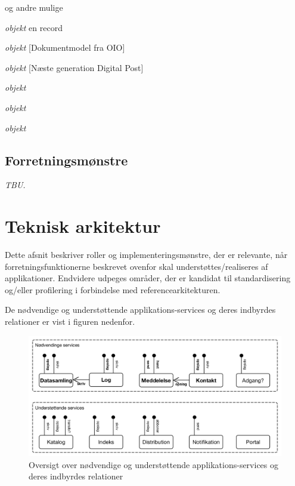 og andre mulige

\begin{description}
\tightlist
\item[registeroplysning]
\emph{objekt} en record
\item[dokument]
\emph{objekt} {[}Dokumentmodel fra OIO{]}
\item[påmindelse]
\emph{objekt} {[}Næste generation Digital Post{]}
\item[registreringshændelse]
\emph{objekt}
\item[forretningshændelse]
\emph{objekt}
\item[klassifikation]
\emph{objekt}
\end{description}

\subsection{Forretningsmønstre}\label{forretningsmuxf8nstre}

\emph{TBU.}

\section{Teknisk arkitektur}\label{teknisk-arkitektur}

Dette afsnit beskriver roller og implementeringsmønstre, der er
relevante, når forretningsfunktionerne beskrevet ovenfor skal
understøttes/realiseres af applikationer. Endvidere udpeges områder, der
er kandidat til standardisering og/eller profilering i forbindelse med
referencearkitekturen.

De nødvendige og understøttende applikations-services og deres indbyrdes
relationer er vist i figuren nedenfor.

\begin{figure}
\centering
\includegraphics[width=\textwidth]{figures/services.png}
\caption{Oversigt over nødvendige og understøttende
applikations-services og deres indbyrdes relationer}
\end{figure}

